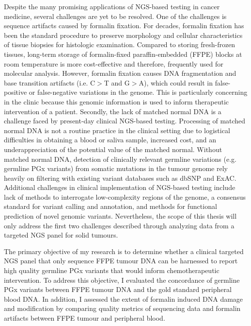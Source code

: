 Despite the many promising applications of NGS-based testing in cancer medicine, several challenges are yet to be resolved. One of the challenges is sequence artifacts caused by formalin fixation. For decades, formalin fixation has been the standard procedure to preserve morphology and cellular characteristics of tissue biopsies for histologic examination. Compared to storing fresh-frozen tissues, long-term storage of formalin-fixed paraffin-embedded (FFPE) blocks at room temperature is more cost-effective and therefore, frequently used for molecular analysis. However, formalin fixation causes DNA fragmentation and base transition artifacts (i.e. C$>$T and G$>$A), which could result in false-positive or false-negative variations in the genome. This is particularly concerning in the clinic because this genomic information is used to inform therapeutic intervention of a patient. Secondly, the lack of matched normal DNA is a challenge faced by present-day clinical NGS-based testing. Processing of matched normal DNA is not a routine practice in the clinical setting due to logistical difficulties in obtaining a blood or saliva sample, increased cost, and an underappreciation of the potential value of the matched normal. Without matched normal DNA, detection of clinically relevant germline variations (e.g. germline PGx variants) from somatic mutations in the tumour genome rely heavily on filtering with existing variant databases such as dbSNP and ExAC. Additional challenges in clinical implementation of NGS-based testing include lack of methods to interrogate low-complexity regions of the genome, a consensus standard for variant calling and annotation, and methods for functional prediction of novel genomic variants. Nevertheless, the scope of this thesis will only address the first two challenges described through analyzing data from a targeted NGS panel for solid tumours.

The primary objective of my research is to determine whether a clinical targeted NGS panel that only sequence FFPE tumour DNA can be harnessed to report high quality germline PGx variants that would inform chemotherapeutic intervention. To address this objective, I evaluated the concordance of germline PGx variants between FFPE tumour DNA and the gold standard peripheral blood DNA. In addition, I assessed the extent of formalin induced DNA damage and modification by comparing quality metrics of sequencing data and formalin artifacts between FFPE tumour and peripheral blood.

